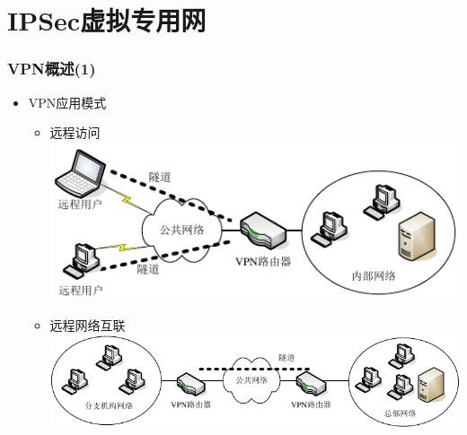 \documentclass[xcolor=svgnames,presentation]{beamer}
\begin{document}
\section{IPSec虚拟专用网}
\label{sec-4}
\begin{frame}
\frametitle{VPN概述(1)}
\label{sec-4-1}
\begin{itemize}

\item VPN应用模式
\label{sec-4-1-1}%
\begin{itemize}

\item 远程访问\\
\label{sec-4-1-1-1}%
\includegraphics[width=.9\linewidth]{img/vpna.png}

\item 远程网络互联\\
\label{sec-4-1-1-2}%
\includegraphics[width=.9\linewidth]{img/vpnb.png}
\end{itemize} %
\end{itemize} %
\end{frame}
\end{document}
